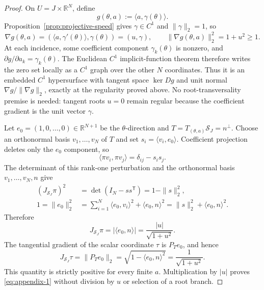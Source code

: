 \begin{proof}
On $U=J\times\mathbb R^N$, define
\[
g(\theta,a):=\langle a,\gamma(\theta)\rangle.
\]
Proposition~\ref{prop:projective-speed} gives $\gamma\in C^1$ and
$\|\gamma\|_2=1$, so
\[
\nabla g(\theta,a)
=(\langle a,\gamma'(\theta)\rangle,\gamma(\theta))=(u,\gamma),
\qquad
\|\nabla g(\theta,a)\|_2^2=1+u^2\geq1.
\]
At each incidence, some coefficient component $\gamma_k(\theta)$ is nonzero,
and $\partial g/\partial a_k=\gamma_k(\theta)$.  The Euclidean $C^1$
implicit-function theorem \citep{rudin1976principles} therefore writes the
zero set locally as a $C^1$ graph over the other $N$ coordinates.  Thus it is
an embedded $C^1$ hypersurface with tangent space $\ker Dg$ and unit normal
$\nabla g/\|\nabla g\|_2$, exactly at the regularity proved above.  No
root-transversality premise is needed: tangent roots $u=0$ remain regular
because the coefficient gradient is the unit vector $\gamma$.

Let $e_0=(1,0,\ldots,0)\in\mathbb R^{N+1}$ be the $\theta$-direction and
$T=T_{(\theta,a)}\mathcal S_J=n^\perp$.  Choose an orthonormal basis
$v_1,\ldots,v_N$ of $T$ and set $s_i=\langle v_i,e_0\rangle$.  Coefficient
projection deletes only the $e_0$ component, so
\[
\langle\pi v_i,\pi v_j\rangle=\delta_{ij}-s_is_j.
\]
The determinant of this rank-one perturbation and the orthonormal basis
$v_1,\ldots,v_N,n$ give
\[
\begin{aligned}
(J_{\mathcal S_J}\pi)^2
&=\det(I_N-ss^{\mathsf T})=1-\|s\|_2^2,\\
1=\|e_0\|_2^2
&=\sum_{i=1}^N\langle e_0,v_i\rangle^2
 +\langle e_0,n\rangle^2
=\|s\|_2^2+\langle e_0,n\rangle^2.
\end{aligned}
\]
Therefore
\[
J_{\mathcal S_J}\pi
=|\langle e_0,n\rangle|
=\frac{|u|}{\sqrt{1+u^2}}.
\]
The tangential gradient of the scalar coordinate $\tau$ is $P_Te_0$, and
hence
\[
J_{\mathcal S_J}\tau
=\|P_Te_0\|_2
=\sqrt{1-\langle e_0,n\rangle^2}
=\frac1{\sqrt{1+u^2}}.
\]
This quantity is strictly positive for every finite $a$.  Multiplication by
$|u|$ proves \eqref{eq:appendix-1} without division by $u$ or selection of a root branch.
\end{proof}

